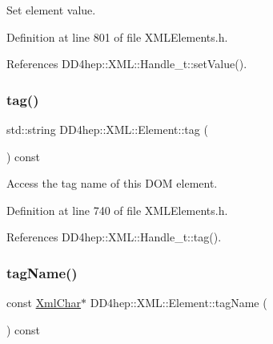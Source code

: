 Set element value. 



Definition at line 801 of file X\+M\+L\+Elements.\+h.



References D\+D4hep\+::\+X\+M\+L\+::\+Handle\+\_\+t\+::set\+Value().

\hypertarget{class_d_d4hep_1_1_x_m_l_1_1_element_ade0bb178aee242e967d48be672c66b1d}{}\label{class_d_d4hep_1_1_x_m_l_1_1_element_ade0bb178aee242e967d48be672c66b1d} 
\subsubsection{\texorpdfstring{tag()}{tag()}}
{\footnotesize\ttfamily std\+::string D\+D4hep\+::\+X\+M\+L\+::\+Element\+::tag (\begin{DoxyParamCaption}{ }\end{DoxyParamCaption}) const\hspace{0.3cm}{\ttfamily [inline]}}



Access the tag name of this D\+OM element. 



Definition at line 740 of file X\+M\+L\+Elements.\+h.



References D\+D4hep\+::\+X\+M\+L\+::\+Handle\+\_\+t\+::tag().

\hypertarget{class_d_d4hep_1_1_x_m_l_1_1_element_ad976880d3f947fc78b841ff64fcffbca}{}\label{class_d_d4hep_1_1_x_m_l_1_1_element_ad976880d3f947fc78b841ff64fcffbca} 
\subsubsection{\texorpdfstring{tag\+Name()}{tagName()}}
{\footnotesize\ttfamily const \hyperlink{namespace_d_d4hep_1_1_x_m_l_a09e5d9cc86ed782f6826dfe0778c1815}{Xml\+Char}$\ast$ D\+D4hep\+::\+X\+M\+L\+::\+Element\+::tag\+Name (\begin{DoxyParamCaption}{ }\end{DoxyParamCaption}) const\hspace{0.3cm}{\ttfamily [inline]}}



